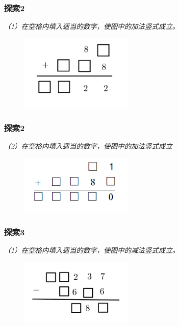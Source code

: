 \begin{frame}
    \frametitle{探索2}
    \textit{（1）在空格内填入适当的数字，使图中的加法竖式成立。}
    
    \begin{figure}[H] 
        \centering
        \includegraphics[width=0.5\textwidth]{./pics/Chapter_3/tansuo2_1.png}
    \end{figure}
\end{frame}

\begin{frame}
    \frametitle{探索2}
    \textit{（2）在空格内填入适当的数字，使图中的加法竖式成立}
    \begin{figure}[H] 
        \centering
        \includegraphics[width=0.5\textwidth]{./pics/Chapter_3/tansuo2_2.png}
    \end{figure}
\end{frame}

\begin{frame}
    \frametitle{探索3}
    \textit{（1）在空格内填入适当的数字，使图中的减法竖式成立。}
    \begin{figure}[H] 
        \centering
        \includegraphics[width=0.5\textwidth]{./pics/Chapter_3/tansuo3_1.png}
    \end{figure}
\end{frame}

